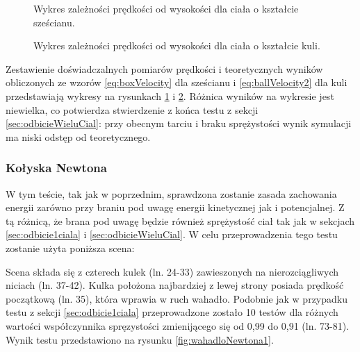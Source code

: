 \begin{figure}
\centering

\caption{Wykres zależności prędkości od wysokości dla ciała o kształcie
sześcianu.}
\label{fig:boxDiagram}
\end{figure}

\begin{figure}
\centering

\caption{Wykres zależności prędkości od wysokości dla ciała o kształcie
kuli.}
\label{fig:ballDiagram}
\end{figure}

Zestawienie doświadczalnych pomiarów prędkości i teoretycznych wyników
obliczonych ze wzorów \ref{eq:boxVelocity} dla sześcianu i
\ref{eq:ballVelocity2} dla kuli przedstawiają wykresy na rysunkach
\ref{fig:boxDiagram} i \ref{fig:ballDiagram}. Różnica wyników na wykresie jest
niewielka, co potwierdza stwierdzenie z końca testu z sekcji
\ref{sec:odbicieWieluCial}: przy obecnym tarciu i braku sprężystości wynik
symulacji ma niski odstęp od teoretycznego.

\subsubsection{Kołyska Newtona}
W tym teście, tak jak w poprzednim, sprawdzona zostanie zasada zachowania
energii zarówno przy braniu pod uwagę energii kinetycznej jak i potencjalnej.
Z tą różnicą, że brana pod uwagę będzie również sprężystość ciał tak jak w
sekcjach \ref{sec:odbicie1ciala} i \ref{sec:odbicieWieluCial}. W celu
przeprowadzenia tego testu zostanie użyta poniższa scena:



Scena składa się z czterech kulek (ln. 24-33) zawieszonych na nierozciągliwych
niciach (ln. 37-42). Kulka położona najbardziej z lewej strony posiada prędkość
początkową (ln. 35), która wprawia w ruch wahadło. Podobnie jak w przypadku
testu z sekcji \ref{sec:odbicie1ciala} przeprowadzone zostało 10 testów dla
różnych wartości współczynnika spręzystości zmienijącego się od 0,99 do 0,91
(ln.
73-81). Wynik testu przedstawiono na rysunku \ref{fig:wahadloNewtona1}.

